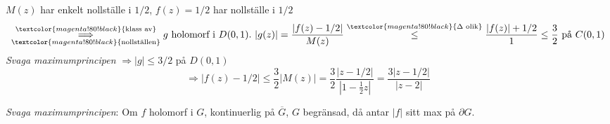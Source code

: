 $M(z)$ har enkelt nollställe i $1/2$, $f(z) = 1/2$ har nollställe i $1/2$
\[ \underset{\textcolor{magenta!80!black}{\text{nollställen}}}{\overset{\textcolor{magenta!80!black}{\text{klass av}}}{\Longrightarrow}} g \text{ holomorf i } D(0, 1).\ |g(z)| = \frac{|f(z) - 1/2|}{M(z)} \overset{\textcolor{magenta!80!black}{\Delta \text{ olik}}}{\le} \frac{|f(z)| + 1/2}{1} \le \frac{3}{2} \text{ på } C(0, 1) \]
\emph{Svaga maximumprincipen} $\Rightarrow |g| \le 3/2$ på $D(0, 1)$
\[ \Rightarrow |f(z) - 1/2| \le \frac{3}{2}|M(z)| = \frac{3}{2} \frac{|z - 1/2|}{|1 - \frac{1}{2}z|} = \frac{3|z - 1/2|}{|z - 2|} \]

\emph{Svaga maximumprincipen}: Om $f$ holomorf i $G$, kontinuerlig på $\overline{G}$, $G$ begränsad, då antar $|f|$ sitt max på $\partial G$.
